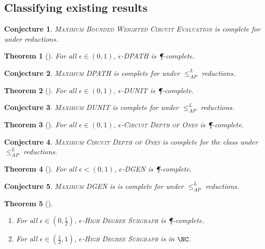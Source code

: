 \documentclass[]{article}
\theoremstyle{plain}
\newtheorem{conjecture}{Conjecture}
\newtheorem{theorem}{Theorem}
\theoremstyle{definition}
\newcommand{\APr}{\leq_{AP}^{L}}
\begin{document}
\subsection{Classifying existing results}

\begin{conjecture}
  \textsc{Maximum Bounded Weighted Circuit Evaluation} is complete for \ApxNCOp{} under \NCAS{} reductions.
\end{conjecture}

\begin{theorem}[{\cite[Theorem~1]{ss89}}]
  For all $\epsilon \in (0, 1)$, \textsc{$\epsilon$-DPATH} is \P-complete.
\end{theorem}

\begin{conjecture}
  \textsc{Maximum DPATH} is complete for \logApxNCOp{} under $\APr$ reductions.
\end{conjecture}

\begin{theorem}[{\cite[Theorem~2]{ss89}}]
  For all $\epsilon \in (0, 1)$, \textsc{$\epsilon$-DUNIT} is \P-complete.
\end{theorem}

\begin{conjecture}
  \textsc{Maximum DUNIT} is complete for \logApxNCOp{} under $\APr$ reductions.
\end{conjecture}

\begin{theorem}[{\cite{kl88}}]
  For all $\epsilon \in (0, 1)$, \textsc{$\epsilon$-Circuit Depth of Ones} is \P-complete.
\end{theorem}

\begin{conjecture}
  \textsc{Maximum Circuit Depth of Ones} is complete for the class \logApxNCOp{} under $\APr$ reductions.
\end{conjecture}

\begin{theorem}[{\cite[Theorem~4]{ss89}}]
  For all $\epsilon < (0, 1)$, \textsc{$\epsilon$-DGEN} is \P-complete.
\end{theorem}

\begin{conjecture}
  \textsc{Maximum DGEN} is is complete for \logApxNCOp{} under $\APr$ reductions.
\end{conjecture}

\begin{theorem}[{\cite[{Theorem~4 and Theorem~5}]{am84}}]
  \mbox{}
  \begin{enumerate}
  \item For all $\epsilon \in (0, \frac{1}{2})$, \textsc{$\epsilon$-High Degree Subgraph} is \P-complete.
  \item For all $\epsilon \in (\frac{1}{2}, 1)$, \textsc{$\epsilon$-High Degree Subgraph} is in $\NC$.
  \end{enumerate}
\end{theorem}
\end{document}
